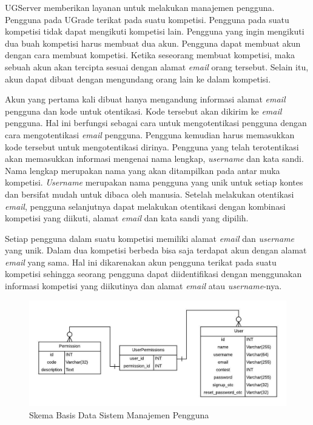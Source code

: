 \par UGServer memberikan layanan untuk melakukan manajemen pengguna. Pengguna pada UGrade terikat pada suatu kompetisi. Pengguna pada suatu kompetisi tidak dapat mengikuti kompetisi lain. Pengguna yang ingin mengikuti dua buah kompetisi harus membuat dua akun. Pengguna dapat membuat akun dengan cara membuat kompetisi. Ketika seseorang membuat kompetisi, maka sebuah akun akan tercipta sesuai dengan alamat \textit{email} orang tersebut. Selain itu, akun dapat dibuat dengan mengundang orang lain ke dalam kompetisi.

\par Akun yang pertama kali dibuat hanya mengandung informasi alamat \textit{email} pengguna dan kode untuk otentikasi. Kode tersebut akan dikirim ke \textit{email} pengguna. Hal ini berfungsi sebagai cara untuk mengotentikasi pengguna dengan cara mengotentikasi \textit{email} pengguna. Pengguna kemudian harus memasukkan kode tersebut untuk mengotentikasi dirinya. Pengguna yang telah terotentikasi akan memasukkan informasi mengenai nama lengkap, \textit{username} dan kata sandi. Nama lengkap merupakan nama yang akan ditampilkan pada antar muka kompetisi. \textit{Username} merupakan nama pengguna yang unik untuk setiap kontes dan bersifat mudah untuk dibaca oleh manusia. Setelah melakukan otentikasi \textit{email}, pengguna selanjutnya dapat melakukan otentikasi dengan kombinasi kompetisi yang diikuti, alamat \textit{email} dan kata sandi yang dipilih. 

\par Setiap pengguna dalam suatu kompetisi memiliki alamat \textit{email} dan \textit{username} yang unik. Dalam dua kompetisi berbeda bisa saja terdapat akun dengan alamat \textit{email} yang sama. Hal ini dikarenakan akun pengguna terikat pada suatu kompetisi sehingga seorang pengguna dapat diidentifikasi dengan menggunakan informasi kompetisi yang diikutinya dan alamat \textit{email} atau \textit{username}-nya.

\begin{figure}[ht!]
    \centering
    \includegraphics[width=\textwidth]{images/user-schema}
    \caption{Skema Basis Data Sistem Manajemen Pengguna}
    \label{fig:user-schema}
\end{figure}

